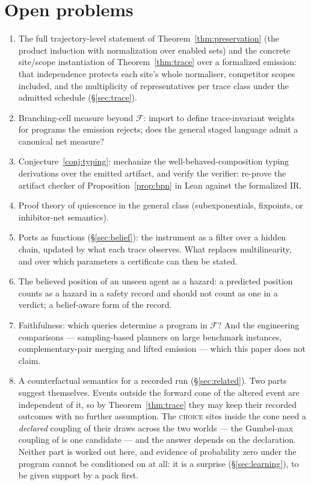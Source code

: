 \documentclass[11pt]{article}
\newcommand{\cclass}{\mathcal{F}}                  %
\theoremstyle{plain}
\theoremstyle{definition}
\theoremstyle{remark}
\begin{document}
\section{Open problems}\label{sec:open}

\begin{enumerate}[leftmargin=2em]
\item The full trajectory-level statement of
  Theorem~\ref{thm:preservation} (the product induction with
  normalization over enabled sets) and the concrete site/scope
  instantiation of Theorem~\ref{thm:trace} over a formalized emission:
  that independence protects each site's whole normaliser, competitor
  scopes included, and the multiplicity of representatives per trace
  class under the admitted schedule (\S\ref{sec:trace}).
\item Branching-cell measure beyond $\cclass$: import \cite{AB06} to
  define trace-invariant weights for programs the emission rejects;
  does the general staged language admit a canonical net measure?
\item Conjecture~\ref{conj:typing}: mechanize the \cite{DEF26}
  well-behaved-composition typing derivations over the emitted
  artifact, and verify the verifier: re-prove the artifact checker of
  Proposition~\ref{prop:bpn} in Lean against the formalized IR.
\item Proof theory of quiescence in the general class
  (subexponentials, fixpoints, or inhibitor-net semantics).
\item Ports as functions (\S\ref{sec:belief}): the instrument as a
  filter over a hidden chain, updated by what each trace observes. What
  replaces multilinearity, and over which parameters a certificate can
  then be stated.
\item The believed position of an unseen agent as a hazard: a
  predicted position counts as a hazard in a safety record and should
  not count as one in a verdict; a belief-aware form of the record.
\item Faithfulness: which queries determine a program in $\cclass$?
  And the engineering comparisons --- sampling-based planners on large
  benchmark instances, complementary-pair merging and lifted emission
  --- which this paper does not claim.
\item A counterfactual semantics for a recorded run
  (\S\ref{sec:related}). Two parts suggest themselves. Events outside
  the forward cone of the altered event are independent of it, so by
  Theorem~\ref{thm:trace} they may keep their recorded outcomes with no
  further assumption. The \textsc{choice} sites inside the cone need a
  \emph{declared} coupling of their draws across the two worlds --- the
  Gumbel-max coupling of \cite{OS19} is one candidate --- and the
  answer depends on the declaration. Neither part is worked out here,
  and evidence of probability zero under the program cannot be
  conditioned on at all: it is a surprise (\S\ref{sec:learning}), to be
  given support by a pack first.
\end{enumerate}
\end{document}
